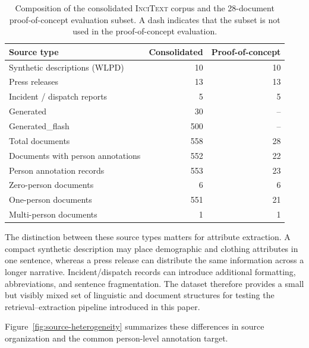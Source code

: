\documentclass[sigconf,nonacm]{acmart}
\newcommand{\incitext}{\textsc{InciText}}
\begin{document}
\begin{table}[t]
    \centering
    \caption{Composition of the consolidated \incitext{} corpus and the
    28-document proof-of-concept evaluation subset. A dash indicates that the
    subset is not used in the proof-of-concept evaluation.}
    \label{tab:dataset-composition}
    \begin{tabular}{lrr}
        \toprule
        Source type & Consolidated & Proof-of-concept \\
        \midrule
        Synthetic descriptions (WLPD) & 10 & 10 \\
        Press releases & 13 & 13 \\
        Incident / dispatch reports & 5 & 5 \\
        Generated & 30 & -- \\
        Generated\_flash & 500 & -- \\
        \midrule
        Total documents & 558 & 28 \\
        Documents with person annotations & 552 & 22 \\
        Person annotation records & 553 & 23 \\
        Zero-person documents & 6 & 6 \\
        One-person documents & 551 & 21 \\
        Multi-person documents & 1 & 1 \\
        \bottomrule
    \end{tabular}
\end{table}

The distinction between these source types matters for attribute extraction.
A compact synthetic description may place demographic and clothing attributes
in one sentence, whereas a press release can distribute the same information
across a longer narrative. Incident/dispatch records can introduce additional
formatting, abbreviations, and sentence fragmentation. The dataset therefore
provides a small but visibly mixed set of linguistic and document structures
for testing the retrieval--extraction pipeline introduced in this paper.

Figure~\ref{fig:source-heterogeneity} summarizes these differences in source
organization and the common person-level annotation target.
\end{document}

